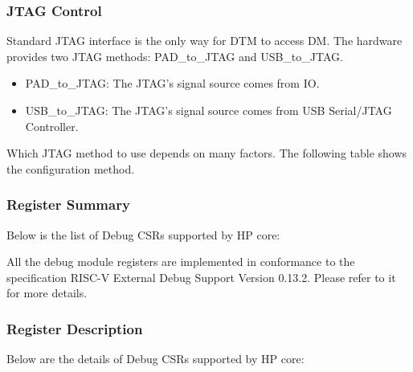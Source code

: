 \documentclass[main\_\_EN.tex]{subfiles}
\begin{document}
\subsubsection{JTAG Control}
\label{sec:riscvcpu-dbg-jtag-cntl}

Standard JTAG interface is the only way for DTM to access DM. The hardware provides two JTAG methods: PAD\_to\_JTAG and USB\_to\_JTAG.

\begin{itemize}
    \item {PAD\_to\_JTAG: The JTAG's signal source comes from IO.}
    \item {USB\_to\_JTAG: The JTAG's signal source comes from USB Serial/JTAG Controller.}
\end{itemize}

Which JTAG method to use depends on many factors. The following table shows the configuration method.






\hypertarget{riscvcpu-dbg-reg-summ}{}
\subsubsection{Register Summary}
\label{sec:riscvcpu-dbg-reg-summ}

Below is the list of Debug CSRs supported by HP core:


All the debug module registers are implemented in conformance to the specification RISC-V External Debug Support Version 0.13.2. Please refer to it for more details.



\subsubsection{Register Description}
Below are the details of Debug CSRs supported by HP core:








\end{document}
